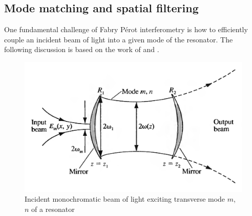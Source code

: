 \subsection{Mode matching and spatial filtering}
\label{subsec:mode-matching-spatial-filtering}
One fundamental challenge of Fabry Pérot interferometry is how to efficiently couple an incident beam of light into a given mode of the resonator.
The following discussion is based on the work of \textcite{yariv_photonics:_2007} and \textcite{meschede_optik_2008}.
\begin{figure}[H]
	\centering
	\includegraphics[width=0.7\linewidth]{figures/fabry-perot/excitation-of-transverse-mode}
	\caption{Incident monochromatic beam of light exciting transverse mode $m$, $n$ of a resonator~\cite{yariv_photonics:_2007}}
	\label{fig:excitation-of-transverse-mode}
\end{figure}

